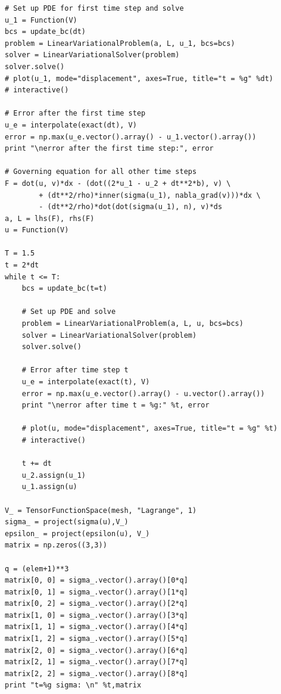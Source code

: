 \documentclass[twoside]{article}
\begin{document}
\begin{lstlisting}
# Set up PDE for first time step and solve
u_1 = Function(V)
bcs = update_bc(dt)
problem = LinearVariationalProblem(a, L, u_1, bcs=bcs)
solver = LinearVariationalSolver(problem)
solver.solve()
# plot(u_1, mode="displacement", axes=True, title="t = %g" %dt)
# interactive()

# Error after the first time step
u_e = interpolate(exact(dt), V)
error = np.max(u_e.vector().array() - u_1.vector().array())
print "\nerror after the first time step:", error

# Governing equation for all other time steps
F = dot(u, v)*dx - (dot((2*u_1 - u_2 + dt**2*b), v) \
		+ (dt**2/rho)*inner(sigma(u_1), nabla_grad(v)))*dx \
		- (dt**2/rho)*dot(dot(sigma(u_1), n), v)*ds
a, L = lhs(F), rhs(F)
u = Function(V)

T = 1.5
t = 2*dt
while t <= T:
	bcs = update_bc(t=t)

	# Set up PDE and solve
	problem = LinearVariationalProblem(a, L, u, bcs=bcs)
	solver = LinearVariationalSolver(problem)
	solver.solve()
	
	# Error after time step t
	u_e = interpolate(exact(t), V)
	error = np.max(u_e.vector().array() - u.vector().array())
	print "\nerror after time t = %g:" %t, error

	# plot(u, mode="displacement", axes=True, title="t = %g" %t)
	# interactive()
	
	t += dt
	u_2.assign(u_1)
	u_1.assign(u)

V_ = TensorFunctionSpace(mesh, "Lagrange", 1)
sigma_ = project(sigma(u),V_)
epsilon_ = project(epsilon(u), V_)
matrix = np.zeros((3,3))

q = (elem+1)**3
matrix[0, 0] = sigma_.vector().array()[0*q]
matrix[0, 1] = sigma_.vector().array()[1*q]
matrix[0, 2] = sigma_.vector().array()[2*q]
matrix[1, 0] = sigma_.vector().array()[3*q]
matrix[1, 1] = sigma_.vector().array()[4*q]
matrix[1, 2] = sigma_.vector().array()[5*q]
matrix[2, 0] = sigma_.vector().array()[6*q]
matrix[2, 1] = sigma_.vector().array()[7*q]
matrix[2, 2] = sigma_.vector().array()[8*q]
print "t=%g sigma: \n" %t,matrix
\end{lstlisting}
\end{document}
